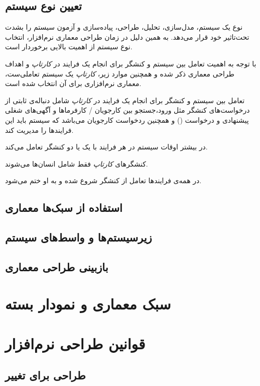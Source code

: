 \documentclass[12pt,svgnames,oneside]{book}
\newcounter{itemadded}
\let\LaTeXStandardEnumerateBegin\enumerate
\let\LaTeXStandardEnumerateEnd\endenumerate
\renewenvironment{enumerate}{%
	\LaTeXStandardEnumerateBegin%
	\setcounter{itemadded}{0}
}{%
	\LaTeXStandardEnumerateEnd%
}%
\begin{document}
			\subsection{تعیین نوع سیستم}
				نوع یک سیستم، مدل‌سازی، تحلیل، طراحی، پیاده‌سازی و آزمون سیستم را بشدت تحت‌تاثیر خود قرار می‌دهد. به همین دلیل در زمان طراحی معماری نرم‌افزار، انتخاب نوع سیستم از اهمیت بالایی برخوردار است.
				
				با توجه به اهمیت تعامل بین سیستم و کنشگر برای انجام یک فرایند در \textit{کارتاپ} و اهداف طراحی معماری ذکر شده و همچنین موارد زیر، \textit{کارتاپ} یک سیستم تعاملی‌ست، معماری نرم‌افزاری  برای آن انتخاب شده است.
				
				\begin{enumerate}
					\item
					تعامل بین سیستم و کنشگر برای انجام یک فرایند در \textit{کارتاپ} شامل دنباله‌ی ثابتی از درخواست‌های کنشگر مثل ورود،‌جستجو بین کارجویان / کارفرما‌ها و آگهی‌های شغلی پیشنهادی و درخواست () و همچنین ردخواست کارجویان می‌باشد که سیستم باید این فرایند‌ها را مدیریت کند.
					\item 
					در بیشتر اوقات سیستم در هر فرایند با یک یا دو کنشگر تعامل می‌کند.
					\item 
					کنشگر‌های \textit{کارتاپ} فقط شامل انسان‌ها می‌شوند.
					
					\item 
					در همه‌ی فرایند‌ها تعامل از کنشگر شروع شده و به او ختم می‌شود.
					\item 
				\end{enumerate}
			\subsection{استفاده از سبک‌ها معماری}
			\subsection{زیرسیستم‌‌ها و واسط‌های سیستم}
			\subsection{بازبینی طراحی معماری}
		\section{سبک‌ معماری و نمودار بسته}
		\section{قوانین طراحی نرم‌افزار}
			\subsection{طراحی برای تغییر}
\end{document}
